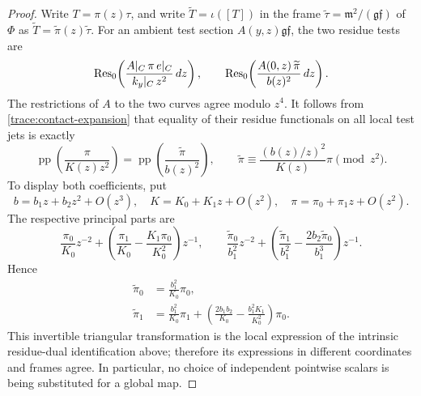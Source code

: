 \begin{proof}
Write $T=\pi(z)\tau$, and write
$\widetilde T=\iota([T])$ in the frame
$\widetilde\tau=\mathfrak m^2/(\mathfrak g\mathfrak f)$ of $\Phi$
as $\widetilde T=\widetilde\pi(z)\widetilde\tau$.
For an ambient test section $A(y,z)\mathfrak g\mathfrak f$, the two
residue tests are
\begin{equation}\label{trace:local-residue-tests}
 \operatorname{Res}_0\!\left(
  \frac{A|_C\,\pi\,e|_C}{k_y|_C\,z^2}\,dz\right),
 \qquad
 \operatorname{Res}_0\!\left(
  \frac{A(0,z)\,\widetilde\pi}{b(z)^2}\,dz\right).
\end{equation}
The restrictions of $A$ to the two curves agree modulo $z^4$.
It follows from \eqref{trace:contact-expansion} that equality of their
residue functionals on all local test jets is exactly
\begin{equation}\label{trace:full-pp}
 \operatorname{pp}\!\left(\frac{\pi}{K(z)z^2}\right)
  =\operatorname{pp}\!\left(\frac{\widetilde\pi}{b(z)^2}\right),
 \qquad
 \widetilde\pi\equiv\frac{(b(z)/z)^2}{K(z)}\pi\pmod{z^2}.
\end{equation}
To display both coefficients, put
\[
 b=b_1z+b_2z^2+O(z^3),\quad K=K_0+K_1z+O(z^2),\quad
 \pi=\pi_0+\pi_1z+O(z^2).
\]
The respective principal parts are
\[
 \frac{\pi_0}{K_0}z^{-2}
 +\left(\frac{\pi_1}{K_0}-\frac{K_1\pi_0}{K_0^2}\right)z^{-1},
 \qquad
 \frac{\widetilde\pi_0}{b_1^2}z^{-2}
 +\left(\frac{\widetilde\pi_1}{b_1^2}
        -\frac{2b_2\widetilde\pi_0}{b_1^3}\right)z^{-1}.
\]
Hence
\begin{equation}\label{trace:two-coefficients}
 \begin{split}
 \widetilde\pi_0&=\frac{b_1^2}{K_0}\pi_0,\\
 \widetilde\pi_1&=\frac{b_1^2}{K_0}\pi_1+
       \left(\frac{2b_1b_2}{K_0}
                    -\frac{b_1^2K_1}{K_0^2}\right)\pi_0.
 \end{split}
\end{equation}
This invertible triangular transformation is the local expression of
the intrinsic residue-dual identification above; therefore its expressions
in different coordinates and frames agree.  In particular, no choice
of independent pointwise scalars is being substituted for a global map.


\end{proof}

